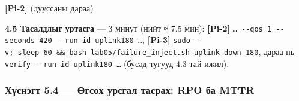 \textbf{{[}Pi-2{]}} (дууссаны дараа)

\begin{Shaded}
\begin{Highlighting}[]
  \KeywordTok{\textbackslash{}}
    \KeywordTok{\textbackslash{}}
\end{Highlighting}
\end{Shaded}

\textbf{4.5 Тасалдлыг уртасга} --- 3 минут (нийт ≈ 7.5 мин): \textbf{{[}Pi-2{]}} \texttt{\ldots{}\ -\/\allowbreak{}-qos\ 1\ -\/\allowbreak{}-seconds\ 420\ -\/\allowbreak{}-run-id\ uplink180\ \ldots{}}, \textbf{{[}Pi-3{]}} \texttt{sudo\ -v;\ sleep\ 60\ \&\allowbreak{}\&\allowbreak{}\ bash\ lab05/\allowbreak{}failure\_\allowbreak{}inject.\allowbreak{}sh\ uplink-down\ 180}, дараа нь \texttt{verify\ -\/\allowbreak{}-run-id\ uplink180\ \ldots{}} (бусад тугууд 4.3-тай ижил).

\hypertarget{ux445ux4afux441ux43dux44dux433ux442-5.4-ux4e9ux433ux441ux4e9ux445-ux443ux440ux441ux433ux430ux43b-ux442ux430ux441ux440ux430ux445-rpo-ux431ux430-mttr}{%
\subsubsection{Хүснэгт 5.4 --- Өгсөх урсгал тасрах: RPO ба MTTR}\label{ux445ux4afux441ux43dux44dux433ux442-5.4-ux4e9ux433ux441ux4e9ux445-ux443ux440ux441ux433ux430ux43b-ux442ux430ux441ux440ux430ux445-rpo-ux431ux430-mttr}}

